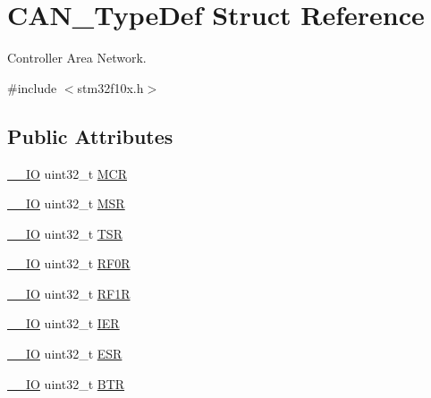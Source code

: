 \hypertarget{struct_c_a_n___type_def}{\section{C\-A\-N\-\_\-\-Type\-Def Struct Reference}
\label{struct_c_a_n___type_def}
}


Controller Area Network.  




{\ttfamily \#include $<$stm32f10x.\-h$>$}

\subsection*{Public Attributes}
\begin{DoxyCompactItemize}
\item 
\hyperlink{group___c_m_s_i_s__core__definitions_gaec43007d9998a0a0e01faede4133d6be}{\-\_\-\-\_\-\-I\-O} uint32\-\_\-t \hyperlink{struct_c_a_n___type_def_a1282eee79a22003257a7a5daa7f4a35f}{M\-C\-R}
\item 
\hyperlink{group___c_m_s_i_s__core__definitions_gaec43007d9998a0a0e01faede4133d6be}{\-\_\-\-\_\-\-I\-O} uint32\-\_\-t \hyperlink{struct_c_a_n___type_def_af98b957a4e887751fbd407d3e2cf93b5}{M\-S\-R}
\item 
\hyperlink{group___c_m_s_i_s__core__definitions_gaec43007d9998a0a0e01faede4133d6be}{\-\_\-\-\_\-\-I\-O} uint32\-\_\-t \hyperlink{struct_c_a_n___type_def_acbc82ac4e87e75350fc586be5e56d95b}{T\-S\-R}
\item 
\hyperlink{group___c_m_s_i_s__core__definitions_gaec43007d9998a0a0e01faede4133d6be}{\-\_\-\-\_\-\-I\-O} uint32\-\_\-t \hyperlink{struct_c_a_n___type_def_ad8e858479e26ab075ee2ddb630e8769d}{R\-F0\-R}
\item 
\hyperlink{group___c_m_s_i_s__core__definitions_gaec43007d9998a0a0e01faede4133d6be}{\-\_\-\-\_\-\-I\-O} uint32\-\_\-t \hyperlink{struct_c_a_n___type_def_a69a528d1288c1de666df68655af1d20e}{R\-F1\-R}
\item 
\hyperlink{group___c_m_s_i_s__core__definitions_gaec43007d9998a0a0e01faede4133d6be}{\-\_\-\-\_\-\-I\-O} uint32\-\_\-t \hyperlink{struct_c_a_n___type_def_a530babbc4b9584c93a1bf87d6ce8b8dc}{I\-E\-R}
\item 
\hyperlink{group___c_m_s_i_s__core__definitions_gaec43007d9998a0a0e01faede4133d6be}{\-\_\-\-\_\-\-I\-O} uint32\-\_\-t \hyperlink{struct_c_a_n___type_def_ab1a1b6a7c587443a03d654d3b9a94423}{E\-S\-R}
\item 
\hyperlink{group___c_m_s_i_s__core__definitions_gaec43007d9998a0a0e01faede4133d6be}{\-\_\-\-\_\-\-I\-O} uint32\-\_\-t \hyperlink{struct_c_a_n___type_def_accad1e4155459a13369f5ad0e7c6da29}{B\-T\-R}

\end{DoxyCompactItemize}
